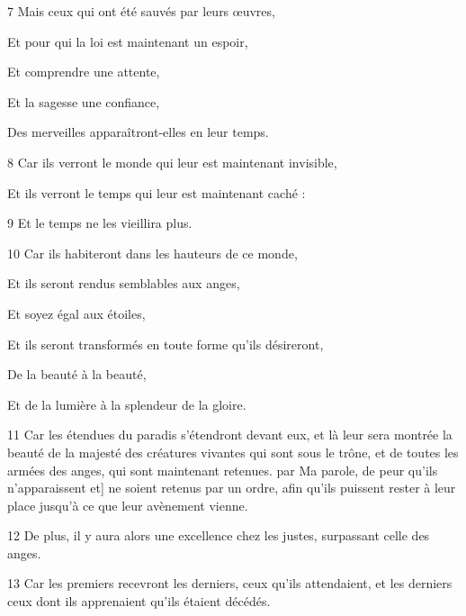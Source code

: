 \par 7 Mais ceux qui ont été sauvés par leurs œuvres,

\par Et pour qui la loi est maintenant un espoir,

\par Et comprendre une attente,

\par Et la sagesse une confiance,

\par Des merveilles apparaîtront-elles en leur temps.

\par 8 Car ils verront le monde qui leur est maintenant invisible,

\par Et ils verront le temps qui leur est maintenant caché :

\par 9 Et le temps ne les vieillira plus.

\par 10 Car ils habiteront dans les hauteurs de ce monde,

\par Et ils seront rendus semblables aux anges,

\par Et soyez égal aux étoiles,

\par Et ils seront transformés en toute forme qu'ils désireront,

\par De la beauté à la beauté,

\par Et de la lumière à la splendeur de la gloire.

\par 11 Car les étendues du paradis s'étendront devant eux, et là leur sera montrée la beauté de la majesté des créatures vivantes qui sont sous le trône, et de toutes les armées des anges, qui sont maintenant retenues. par Ma parole, de peur qu'ils n'apparaissent et] ne soient retenus par un ordre, afin qu'ils puissent rester à leur place jusqu'à ce que leur avènement vienne.

\par 12 De plus, il y aura alors une excellence chez les justes, surpassant celle des anges.

\par 13 Car les premiers recevront les derniers, ceux qu'ils attendaient, et les derniers ceux dont ils apprenaient qu'ils étaient décédés.

